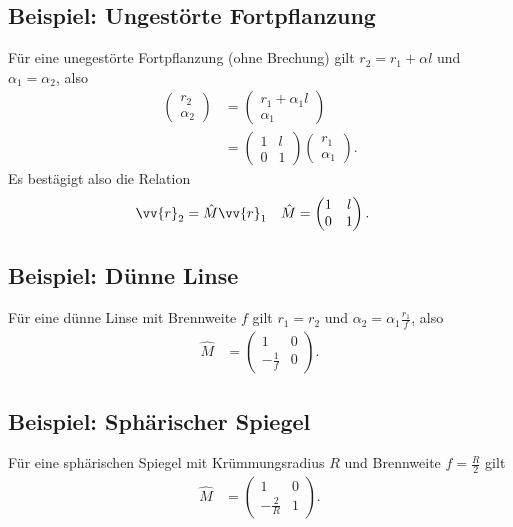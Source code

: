 \documentclass[a4paper,12pt]{article}
\numberwithin{equation}{section}
\begin{document}
\subsection{Beispiel: Ungestörte Fortpflanzung}
Für eine unegestörte Fortpflanzung (ohne Brechung) gilt $r_2=r_1+\alpha l$ und $\alpha _1=\alpha _2$, also
\begin{align} 
        \begin{pmatrix}
                r_2\\\alpha _2
        \end{pmatrix}&=\begin{pmatrix}
                r_1+\alpha _1l\\\alpha _1
        \end{pmatrix}\\
        &=\begin{pmatrix}
                1&l\\0&1
        \end{pmatrix}\begin{pmatrix}
                r_1\\\alpha _1
        \end{pmatrix}
.\end{align} 
Es bestägigt also die Relation 
\begin{align} 
        \vv{r}_2&=\hat{M}\vv{r}_1&\hat{M}&=\begin{pmatrix}
                1&l\\0&1
        \end{pmatrix}
.\end{align} 

\subsection{Beispiel: Dünne Linse}
Für eine dünne Linse mit Brennweite $f$ gilt $r_1=r_2$ und $\alpha _2=\alpha _1\tfrac{r_1}{f}$, also
\begin{align} 
        \hat{M}&=\begin{pmatrix}
                1&0\\-\tfrac{1}{f}&0
        \end{pmatrix}
.\end{align} 

\subsection{Beispiel: Sphärischer Spiegel}
Für eine sphärischen Spiegel mit Krümmungsradius $R$ und Brennweite $f=\tfrac{R}{2}$ gilt
\begin{align} 
        \hat{M}&=\begin{pmatrix}
                1&0\\-\tfrac{2}{R}&1
        \end{pmatrix}
.\end{align} 
\end{document}
